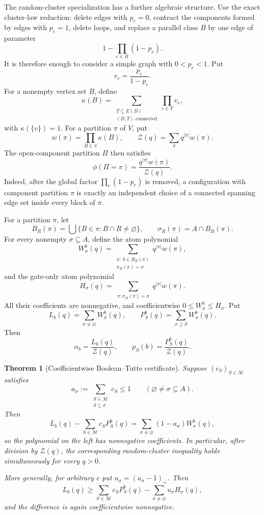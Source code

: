 \documentclass[11pt]{article}
\newtheorem{theorem}{Theorem}[section]
\theoremstyle{definition}
\theoremstyle{remark}
\newcommand{\cM}{\mathcal M}
\newcommand{\cZ}{\mathcal Z}
\newcommand{\RC}{\phi}
\begin{document}
The random-cluster specialization has a further algebraic structure.  Use
the exact cluster-law reduction: delete edges with $p_e=0$, contract the
components formed by edges with $p_e=1$, delete loops, and replace a
parallel class $B$ by one edge of parameter
\[
 1-\prod_{e\in B}(1-p_e).
\]
It is therefore enough to consider a simple graph with $0<p_e<1$.
Put
\[
 v_e=\frac{p_e}{1-p_e}.
\]
For a nonempty vertex set $B$, define
\[
 \kappa(B)=
 \sum_{\substack{T\subseteq E(B)\\(B,T)\text{ connected}}}
 \prod_{e\in T}v_e,
 \tag{6.1}
\]
with $\kappa(\{v\})=1$.  For a partition $\pi$ of $V$, put
\[
 w(\pi)=\prod_{B\in\pi}\kappa(B),
 \qquad
 \cZ(q)=\sum_\pi q^{|\pi|}w(\pi).
 \tag{6.2}
\]
The open-component partition $\Pi$ then satisfies
\[
 \RC(\Pi=\pi)=\frac{q^{|\pi|}w(\pi)}{\cZ(q)}.
 \tag{6.3}
\]
Indeed, after the global factor $\prod_e(1-p_e)$ is removed, a
configuration with component partition $\pi$ is exactly an independent
choice of a connected spanning edge set inside every block of $\pi$.

For a partition $\pi$, let
\[
 B_R(\pi)=\bigcup\{B\in\pi:B\cap R\ne\varnothing\},
 \qquad
 \sigma_R(\pi)=A\cap B_R(\pi).
\]
For every nonempty $\sigma\subseteq A$, define the atom polynomial
\[
 W^b_\sigma(q)=
 \sum_{\substack{\pi:\ b\in B_R(\pi)\\
                         \sigma_R(\pi)=\sigma}}
 q^{|\pi|}w(\pi),
 \tag{6.4}
\]
and the gate-only atom polynomial
\[
 H_\sigma(q)=
 \sum_{\substack{\pi:\sigma_R(\pi)=\sigma}}
 q^{|\pi|}w(\pi).
 \tag{6.5}
\]
All their coefficients are nonnegative, and coefficientwise
$0\leq W^b_\sigma\leq H_\sigma$.  Put
\[
 L_b(q)=\sum_{\sigma\ne\varnothing}W^b_\sigma(q),
 \qquad
 P^b_S(q)=\sum_{\sigma\supseteq S}W^b_\sigma(q).
 \tag{6.6}
\]
Then
\[
 \alpha_b=\frac{L_b(q)}{\cZ(q)},
 \qquad
 p_S(b)=\frac{P^b_S(q)}{\cZ(q)}.
\]

\begin{theorem}[Coefficientwise Boolean--Tutte certificate]
Suppose $(c_S)_{S\in\cM}$ satisfies
\[
 a_\sigma:=
 \sum_{\substack{S\in\cM\\S\subseteq\sigma}}c_S\leq1
 \qquad(\varnothing\ne\sigma\subseteq A).
 \tag{6.7}
\]
Then
\[
 \boxed{
 L_b(q)-\sum_{S\in\cM}c_SP^b_S(q)
 =\sum_{\sigma\ne\varnothing}(1-a_\sigma)W^b_\sigma(q),}
 \tag{6.8}
\]
so the polynomial on the left has nonnegative coefficients.  In
particular, after division by $\cZ(q)$, the corresponding random-cluster
inequality holds simultaneously for every $q>0$.

More generally, for arbitrary $c$ put $u_\sigma=(a_\sigma-1)_+$.  Then
\[
 \boxed{
 L_b(q)\geq
 \sum_{S\in\cM}c_SP^b_S(q)
 -\sum_{\sigma\ne\varnothing}u_\sigma H_\sigma(q),}
 \tag{6.9}
\]
and the difference is again coefficientwise nonnegative.
\end{theorem}
\end{document}
